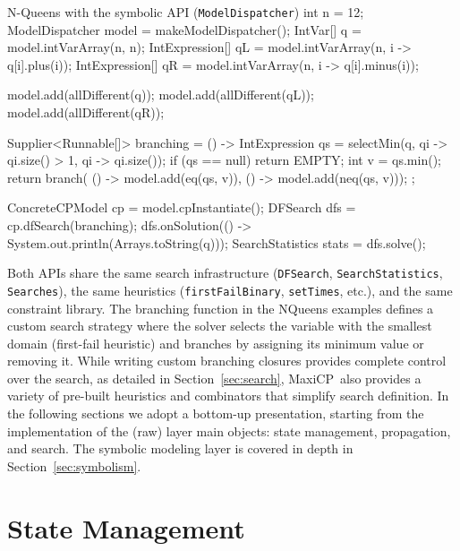 \documentclass[11pt, a4paper]{scrartcl}
\newcommand{\maxicp}{\textsf{MaxiCP}}
\begin{document}
\begin{codebox}[label={lst:nqueens-modeling}]{N-Queens with the symbolic API (\texttt{ModelDispatcher})}
int n = 12;
ModelDispatcher model = makeModelDispatcher();
IntVar[] q  = model.intVarArray(n, n);
IntExpression[] qL = model.intVarArray(n, i -> q[i].plus(i));
IntExpression[] qR = model.intVarArray(n, i -> q[i].minus(i));

model.add(allDifferent(q));
model.add(allDifferent(qL));
model.add(allDifferent(qR));

Supplier<Runnable[]> branching = () -> {
    IntExpression qs = selectMin(q,
            qi -> qi.size() > 1,
            qi -> qi.size());
    if (qs == null) return EMPTY;
    int v = qs.min();
    return branch(
        () -> model.add(eq(qs, v)),
        () -> model.add(neq(qs, v)));
};

ConcreteCPModel cp = model.cpInstantiate();
DFSearch dfs = cp.dfSearch(branching);
dfs.onSolution(() ->
    System.out.println(Arrays.toString(q)));
SearchStatistics stats = dfs.solve();
\end{codebox}

Both APIs share the same search infrastructure (\texttt{DFSearch}, \texttt{SearchStatistics}, \texttt{Searches}), the same heuristics (\texttt{firstFailBinary}, \texttt{setTimes}, etc.), and the same constraint library.
The branching function in the NQueens examples defines a custom search strategy
where the solver selects the variable with the smallest domain (first-fail heuristic)
and branches by assigning its minimum value or removing it.
While writing custom branching closures provides complete control over the search,
as detailed in Section~\ref{sec:search}, \maxicp\ also provides a variety of
pre-built heuristics and combinators that simplify search definition.
In the following sections we adopt a bottom-up presentation, starting from the implementation of the (raw) layer main objects: state management, propagation, and search.
The symbolic modeling layer is covered in depth in Section~\ref{sec:symbolism}.

\section{State Management}
\label{sec:state}
\end{document}
